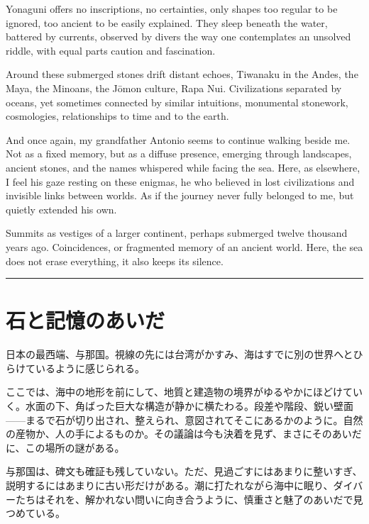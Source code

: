 \documentclass[
  letterpaper,
  oneside]{scrbook}
\begin{document}
Yonaguni offers no inscriptions, no certainties, only shapes too regular
to be ignored, too ancient to be easily explained. They sleep beneath
the water, battered by currents, observed by divers the way one
contemplates an unsolved riddle, with equal parts caution and
fascination.

Around these submerged stones drift distant echoes, Tiwanaku in the
Andes, the Maya, the Minoans, the Jōmon culture, Rapa Nui. Civilizations
separated by oceans, yet sometimes connected by similar intuitions,
monumental stonework, cosmologies, relationships to time and to the
earth.

And once again, my grandfather Antonio seems to continue walking beside
me. Not as a fixed memory, but as a diffuse presence, emerging through
landscapes, ancient stones, and the names whispered while facing the
sea. Here, as elsewhere, I feel his gaze resting on these enigmas, he
who believed in lost civilizations and invisible links between worlds.
As if the journey never fully belonged to me, but quietly extended his
own.

Summits as vestiges of a larger continent, perhaps submerged twelve
thousand years ago. Coincidences, or fragmented memory of an ancient
world. Here, the sea does not erase everything, it also keeps its
silence.

\begin{center}\rule{0.5\linewidth}{0.5pt}\end{center}


\chapter{石と記憶のあいだ}\label{ux77f3ux3068ux8a18ux61b6ux306eux3042ux3044ux3060}

日本の最西端、与那国。視線の先には台湾がかすみ、海はすでに別の世界へとひらけているように感じられる。

ここでは、海中の地形を前にして、地質と建造物の境界がゆるやかにほどけていく。水面の下、角ばった巨大な構造が静かに横たわる。段差や階段、鋭い壁面------まるで石が切り出され、整えられ、意図されてそこにあるかのように。自然の産物か、人の手によるものか。その議論は今も決着を見ず、まさにそのあいだに、この場所の謎がある。

与那国は、碑文も確証も残していない。ただ、見過ごすにはあまりに整いすぎ、説明するにはあまりに古い形だけがある。潮に打たれながら海中に眠り、ダイバーたちはそれを、解かれない問いに向き合うように、慎重さと魅了のあいだで見つめている。
\end{document}
